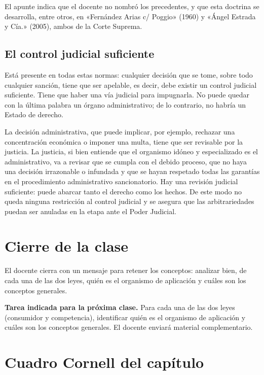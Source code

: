\documentclass[12pt,oneside]{book}
\begin{document}
\begin{note}
El apunte indica que el docente no nombró los precedentes, y que esta doctrina se desarrolla, entre otros, en «Fernández Arias c/ Poggio» (1960) y «Ángel Estrada y Cía.» (2005), ambos de la Corte Suprema.
\end{note}

\subsection{El control judicial suficiente}

Está presente en todas estas normas: cualquier decisión que se tome, sobre todo cualquier sanción, tiene que ser apelable, es decir, debe existir un control judicial suficiente. Tiene que haber una vía judicial para impugnarla. No puede quedar con la última palabra un órgano administrativo; de lo contrario, no habría un Estado de derecho.

La decisión administrativa, que puede implicar, por ejemplo, rechazar una concentración económica o imponer una multa, tiene que ser revisable por la justicia. La justicia, si bien entiende que el organismo idóneo y especializado es el administrativo, va a revisar que se cumpla con el debido proceso, que no haya una decisión irrazonable o infundada y que se hayan respetado todas las garantías en el procedimiento administrativo sancionatorio. Hay una revisión judicial suficiente: puede abarcar tanto el derecho como los hechos. De este modo no queda ninguna restricción al control judicial y se asegura que las arbitrariedades puedan ser anuladas en la etapa ante el Poder Judicial.

\section{Cierre de la clase}

El docente cierra con un mensaje para retener los conceptos: analizar bien, de cada una de las dos leyes, quién es el organismo de aplicación y cuáles son los conceptos generales.

\begin{note}
\textbf{Tarea indicada para la próxima clase.} Para cada una de las dos leyes (consumidor y competencia), identificar quién es el organismo de aplicación y cuáles son los conceptos generales. El docente enviará material complementario.
\end{note}

\section{Cuadro Cornell del capítulo}
\end{document}
